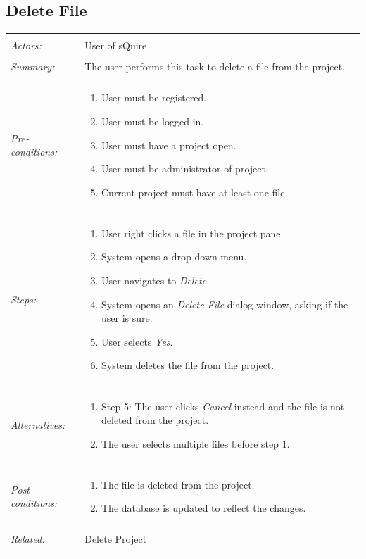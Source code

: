 \documentclass[11pt]{report}
\begin{document}
\subsection{Delete File}
\begin{tabular}{ p{2cm} p{12cm} }
\hline \\
	\textit{Actors:} & User of sQuire \\
	\\
	\textit{Summary:} & The user performs this task to delete a file from the project. \\
	\\
	\textit{Pre-conditions:} & \begin{enumerate}
		\item User must be registered.
		\item User must be logged in.
		\item User must have a project open.
		\item User must be administrator of project.
		\item Current project must have at least one file.
	\end{enumerate} \\
	\\
	\textit{Steps:} & \begin{enumerate}
		\item User right clicks a file in the project pane.
		\item System opens a drop-down menu.
		\item User navigates to \textit{Delete}.
		\item System opens an \textit{Delete File} dialog window, asking if the user is sure.
		\item User selects \textit{Yes}.
		\item System deletes the file from the project.
	\end{enumerate} \\
	\\
	\textit{Alternatives:} & \begin{enumerate}
		\item Step 5: The user clicks \textit{Cancel} instead and the file is not deleted from the project.
		\item The user selects multiple files before step 1.
	\end{enumerate} \\
	\\
	\textit{Post-conditions:} & \begin{enumerate}
		\item The file is deleted from the project.
		\item The database is updated to reflect the changes.
	\end{enumerate} \\
	\\
	\textit{Related:} & Delete Project \\
	\\
\hline
\end{tabular} 
\newpage
\end{document}
